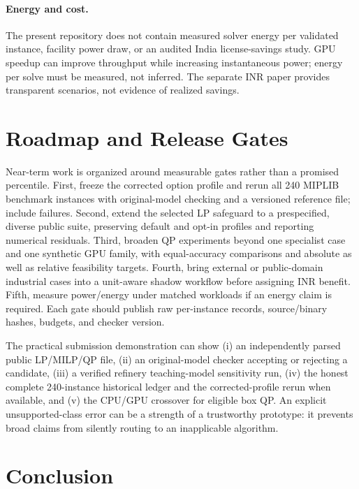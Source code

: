 \documentclass[10pt,a4paper,twocolumn]{article}
\begin{document}
\paragraph{Energy and cost.} The present repository does not contain measured solver energy per validated instance, facility power draw, or an audited India license-savings study. GPU speedup can improve throughput while increasing instantaneous power; energy per solve must be measured, not inferred. The separate INR paper provides transparent scenarios, not evidence of realized savings.

\section{Roadmap and Release Gates}

Near-term work is organized around measurable gates rather than a promised percentile. First, freeze the corrected option profile and rerun all 240 MIPLIB benchmark instances with original-model checking and a versioned reference file; include failures. Second, extend the selected LP safeguard to a prespecified, diverse public suite, preserving default and opt-in profiles and reporting numerical residuals. Third, broaden QP experiments beyond one specialist case and one synthetic GPU family, with equal-accuracy comparisons and absolute as well as relative feasibility targets. Fourth, bring external or public-domain industrial cases into a unit-aware shadow workflow before assigning INR benefit. Fifth, measure power/energy under matched workloads if an energy claim is required. Each gate should publish raw per-instance records, source/binary hashes, budgets, and checker version.

The practical submission demonstration can show (i) an independently parsed public LP/MILP/QP file, (ii) an original-model checker accepting or rejecting a candidate, (iii) a verified refinery teaching-model sensitivity run, (iv) the honest complete 240-instance historical ledger and the corrected-profile rerun when available, and (v) the CPU/GPU crossover for eligible box QP. An explicit unsupported-class error can be a strength of a trustworthy prototype: it prevents broad claims from silently routing to an inapplicable algorithm.

\section{Conclusion}
\end{document}
